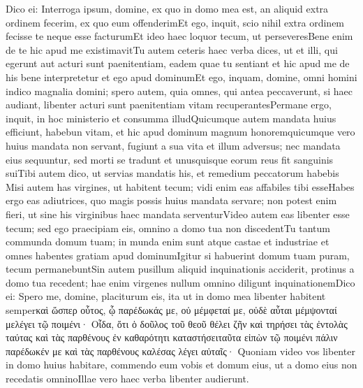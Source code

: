 Dico ei: Interroga ipsum, domine, ex quo in domo mea est, an aliquid extra ordinem fecerim, ex quo eum offenderimEt ego, inquit, scio nihil extra ordinem fecisse te neque esse facturumEt ideo haec loquor tecum, ut perseveresBene enim de te hic apud me existimavitTu autem ceteris haec verba dices, ut et illi, qui egerunt aut acturi sunt paenitentiam, eadem quae tu sentiant et hic apud me de his bene interpretetur et ego apud dominumEt ego, inquam, domine, omni homini indico magnalia domini; spero autem, quia omnes, qui antea peccaverunt, si haec audiant, libenter acturi sunt paenitentiam vitam recuperantesPermane ergo, inquit, in hoc ministerio et consumma illudQuicumque autem mandata huius efficiunt, habebun vitam, et hic apud dominum magnum honoremquicumque vero huius mandata non servant, fugiunt a sua vita et illum adversus; nec mandata eius sequuntur, sed morti se tradunt et unusquisque eorum reus fit sanguinis suiTibi autem dico, ut servias mandatis his, et remedium peccatorum habebis
Misi autem has virgines, ut habitent tecum; vidi enim eas affabiles tibi esseHabes ergo eas adiutrices, quo magis possis huius mandata servare; non potest enim fieri, ut sine his virginibus haec mandata serventurVideo autem eas libenter esse tecum; sed ego praecipiam eis, omnino a domo tua non discedentTu tantum communda domum tuam; in munda enim sunt atque castae et industriae et omnes habentes gratiam apud dominumIgitur si habuerint domum tuam puram, tecum permanebuntSin autem pusillum aliquid inquinationis acciderit, protinus a domo tua recedent; hae enim virgenes nullum omnino diligunt inquinationemDico ei: Spero me, domine, placiturum eis, ita ut in domo mea libenter habitent semperκαὶ ὥσπερ οὗτος, ᾧ παρέδωκάς με, οὐ μέμφεταί με, οὐδὲ αὗται μέμψονταί μελέγει τῷ ποιμένι· Οἶδα, ὅτι ὁ δοῦλος τοῦ θεοῦ θέλει ζῆν καὶ τηρήσει τὰς ἐντολὰς ταύτας καὶ τὰς παρθένους ἐν καθαρότητι καταστήσειταῦτα εἰπὼν τῷ ποιμένι πάλιν παρέδωκέν με καὶ τὰς παρθένους καλέσας λέγει αὐταῖς· Quoniam video vos libenter in domo huius habitare, commendo eum vobis et domum eius, ut a domo eius non recedatis omninoIllae vero haec verba libenter audierunt.

